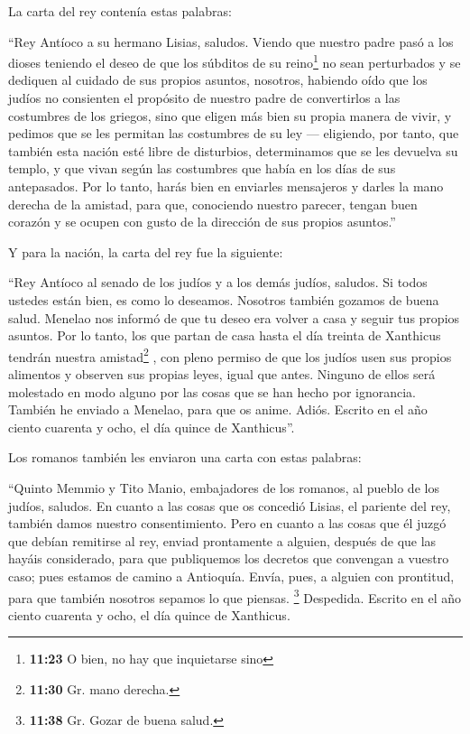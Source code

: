  La carta del rey contenía estas palabras:

``Rey Antíoco a su hermano Lisias, saludos.  Viendo que
nuestro padre pasó a los dioses teniendo el deseo de que los súbditos de
su reino\footnote{\textbf{11:23} O bien, no hay que inquietarse sino} no
sean perturbados y se dediquen al cuidado de sus propios asuntos,
 nosotros, habiendo oído que los judíos no consienten el
propósito de nuestro padre de convertirlos a las costumbres de los
griegos, sino que eligen más bien su propia manera de vivir, y pedimos
que se les permitan las costumbres de su ley --- 
eligiendo, por tanto, que también esta nación esté libre de disturbios,
determinamos que se les devuelva su templo, y que vivan según las
costumbres que había en los días de sus antepasados.  Por
lo tanto, harás bien en enviarles mensajeros y darles la mano derecha de
la amistad, para que, conociendo nuestro parecer, tengan buen corazón y
se ocupen con gusto de la dirección de sus propios asuntos.''

 Y para la nación, la carta del rey fue la siguiente:

``Rey Antíoco al senado de los judíos y a los demás judíos, saludos.
 Si todos ustedes están bien, es como lo deseamos.
Nosotros también gozamos de buena salud.  Menelao nos
informó de que tu deseo era volver a casa y seguir tus propios asuntos.
 Por lo tanto, los que partan de casa hasta el día
treinta de Xanthicus tendrán nuestra amistad\footnote{\textbf{11:30} Gr.
  mano derecha.} , con pleno permiso  de que los judíos
usen sus propios alimentos y observen sus propias leyes, igual que
antes. Ninguno de ellos será molestado en modo alguno por las cosas que
se han hecho por ignorancia.  También he enviado a
Menelao, para que os anime.  Adiós. Escrito en el año
ciento cuarenta y ocho, el día quince de Xanthicus''.

 Los romanos también les enviaron una carta con estas
palabras:

``Quinto Memmio y Tito Manio, embajadores de los romanos, al pueblo de
los judíos, saludos.  En cuanto a las cosas que os
concedió Lisias, el pariente del rey, también damos nuestro
consentimiento.  Pero en cuanto a las cosas que él juzgó
que debían remitirse al rey, enviad prontamente a alguien, después de
que las hayáis considerado, para que publiquemos los decretos que
convengan a vuestro caso; pues estamos de camino a Antioquía.
 Envía, pues, a alguien con prontitud, para que también
nosotros sepamos lo que piensas.  \footnote{\textbf{11:38}
  Gr. Gozar de buena salud.} Despedida. Escrito en el año ciento
cuarenta y ocho, el día quince de Xanthicus.

